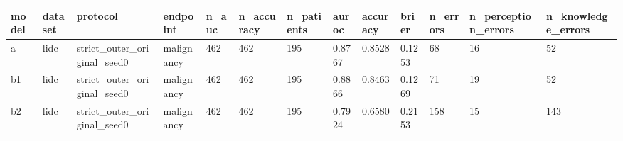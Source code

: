 \begin{tabular}{lllllllllllll}
\hline
model & dataset & protocol & endpoint & n\_auc & n\_accuracy & n\_patients & auroc & accuracy & brier & n\_errors & n\_perception\_errors & n\_knowledge\_errors \\
\hline
a & lidc & strict\_outer\_original\_seed0 & malignancy & 462 & 462 & 195 & 0.8767 & 0.8528 & 0.1253 & 68 & 16 & 52 \\
b1 & lidc & strict\_outer\_original\_seed0 & malignancy & 462 & 462 & 195 & 0.8866 & 0.8463 & 0.1269 & 71 & 19 & 52 \\
b2 & lidc & strict\_outer\_original\_seed0 & malignancy & 462 & 462 & 195 & 0.7924 & 0.6580 & 0.2153 & 158 & 15 & 143 \\
\hline
\end{tabular}
